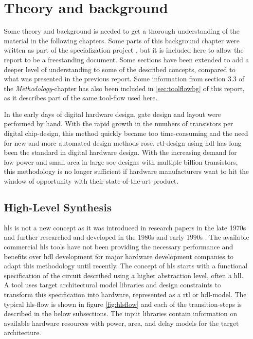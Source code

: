 \chapter{\label{chp:background}Theory and background}
Some theory and background is needed to get a thorough understanding of the material in the following chapters. Some parts of this background chapter were written as part of the specialization project \cite{holm2015pro}, but it is included here to allow the report to be a freestanding document. Some sections have been extended to add a deeper level of understanding to some of the described concepts, compared to what was presented in the previous report. Some information from section 3.3 of the \textit{Methodology}-chapter has also been included in \cref{sec:toolflowbg} of this report, as it describes part of the same tool-flow used here.

In the early days of digital hardware design, gate design and layout were performed by hand. With the rapid growth in the numbers of transistors per digital chip-design, this method quickly became too time-consuming and the need for new and more automated design methods rose. \gls{rtl}-design using \gls{hdl} has long been the standard in digital hardware design. With the increasing demand for low power and small area in large \gls{soc} designs with multiple billion transistors, this methodology is no longer sufficient if hardware manufacturers want to hit the window of opportunity with their state-of-the-art product.

\section{\label{sec:hls}High-Level Synthesis}

\gls{hls} is not a new concept as it was introduced in research papers in the late 1970s and further researched and developed in the 1980s and early 1990s \cite{martin2009high}. The available commercial \gls{hls} tools have not been providing the necessary performance and benefits over \gls{hdl} development for major hardware development companies to adapt this methodology until recently.
The concept of \gls{hls} starts with a functional specification of the circuit described using a higher abstraction level, often a \gls{hll}. A tool uses target architectural model libraries and design constraints to transform this specification into hardware, represented as a \gls{rtl} or \gls{hdl}-model. The typical \gls{hls}-flow is shown in figure \ref{fig:hlsflow} and each of the transition-steps is described in the below subsections. The input libraries contain information on available hardware resources with power, area, and delay models for the target architecture.

